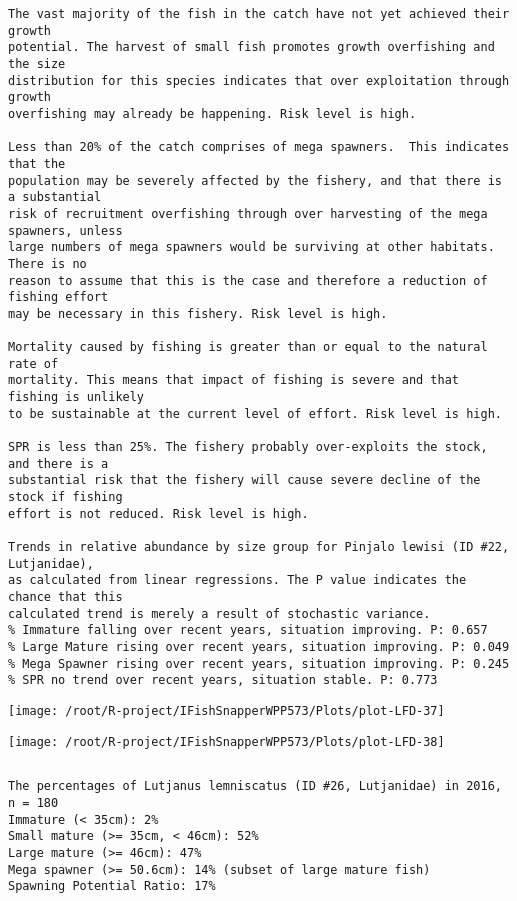 \documentclass{report}\usepackage[]{graphicx}\usepackage[]{color}
\makeatletter
\def\maxwidth{ %
  \ifdim\Gin@nat@width>\linewidth
    \linewidth
  \else
    \Gin@nat@width
  \fi
}
\newenvironment{kframe}{%
 \def\at@end@of@kframe{}%
 \ifinner\ifhmode%
  \def\at@end@of@kframe{\end{minipage}}%
  \begin{minipage}{\columnwidth}%
 \fi\fi%
 \def\FrameCommand##1{\hskip\@totalleftmargin \hskip-\fboxsep
 \colorbox{shadecolor}{##1}\hskip-\fboxsep
     \hskip-\linewidth \hskip-\@totalleftmargin \hskip\columnwidth}%
 \MakeFramed {\advance\hsize-\width
   \@totalleftmargin\z@ \linewidth\hsize
   \@setminipage}}%
 {\par\unskip\endMakeFramed%
 \at@end@of@kframe}
\newenvironment{knitrout}{}{} %
\makeatother
\begin{document}
\begin{knitrout}
\begin{kframe}
\begin{verbatim}
The vast majority of the fish in the catch have not yet achieved their growth
potential. The harvest of small fish promotes growth overfishing and the size
distribution for this species indicates that over exploitation through growth
overfishing may already be happening. Risk level is high.

Less than 20% of the catch comprises of mega spawners.  This indicates that the
population may be severely affected by the fishery, and that there is a substantial
risk of recruitment overfishing through over harvesting of the mega spawners, unless
large numbers of mega spawners would be surviving at other habitats. There is no
reason to assume that this is the case and therefore a reduction of fishing effort
may be necessary in this fishery. Risk level is high.
 
Mortality caused by fishing is greater than or equal to the natural rate of
mortality. This means that impact of fishing is severe and that fishing is unlikely
to be sustainable at the current level of effort. Risk level is high.
 
SPR is less than 25%. The fishery probably over-exploits the stock, and there is a
substantial risk that the fishery will cause severe decline of the stock if fishing
effort is not reduced. Risk level is high.
 
Trends in relative abundance by size group for Pinjalo lewisi (ID #22, Lutjanidae),
as calculated from linear regressions. The P value indicates the chance that this
calculated trend is merely a result of stochastic variance.
% Immature falling over recent years, situation improving. P: 0.657
% Large Mature rising over recent years, situation improving. P: 0.049
% Mega Spawner rising over recent years, situation improving. P: 0.245
% SPR no trend over recent years, situation stable. P: 0.773
\end{verbatim}
\end{kframe}
\texttt{[image: /root/R-project/IFishSnapperWPP573/Plots/plot-LFD-37]} 

\texttt{[image: /root/R-project/IFishSnapperWPP573/Plots/plot-LFD-38]} 
\begin{kframe}\begin{verbatim}
\end{verbatim}
\end{kframe}
\clearpage
\newpage
\begin{kframe}\begin{verbatim}The percentages of Lutjanus lemniscatus (ID #26, Lutjanidae) in 2016, n = 180
Immature (< 35cm): 2%
Small mature (>= 35cm, < 46cm): 52%
Large mature (>= 46cm): 47%
Mega spawner (>= 50.6cm): 14% (subset of large mature fish)
Spawning Potential Ratio: 17%
 

\end{verbatim}
\end{kframe}
\end{knitrout}
\end{document}
